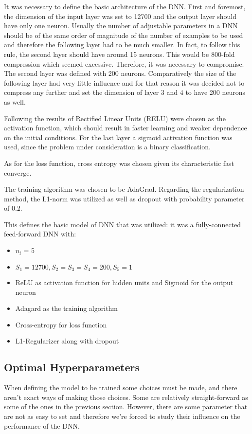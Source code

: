 It was necessary to define the basic architecture of the DNN. First and foremost, the dimension of the input layer was set to 12700 and the output layer should have only one neuron.
Usually the number of adjustable parameters in a DNN should be of the same order of magnitude of the number of examples to be used and therefore the following layer had to be much smaller. In fact, to follow this rule, the second layer should have around 15 neurons. This would be 800-fold compression which seemed excessive. Therefore, it was necessary to compromise. The second layer was defined with 200 neurons. Comparatively the size of the following layer had very little influence and for that reason it was decided not to compress any further and set the dimension of layer 3 and 4 to have 200 neurons as well. 

Following the results of \cite{glorot2011deep} Rectified Linear Units (RELU) were chosen as the activation function, which should result in faster learning and weaker dependence on the initial conditions. For the last layer a sigmoid activation function was used, since the problem under consideration is a binary classification.

As for the loss function, cross entropy was chosen given its characteristic fast converge.

The training algorithm was chosen to be AdaGrad.
Regarding the regularization method, the L1-norm was utilized as well as dropout with probability parameter of 0.2.

This defines the basic model of DNN that was utilized: it was a fully-connected feed-forward DNN with:
\begin{itemize}
\item $n_l$ = 5
\item $S_1 = 12700, S_2=S_3=S_4 = 200, S_5=1$
\item ReLU as activation function for hidden units and Sigmoid for the output neuron
\item Adagard as the training algorithm
\item Cross-entropy for loss function
\item L1-Regularizer along with dropout
\end{itemize}

\subsection{Optimal Hyperparameters}
\label{subsec:hyperparameters}

When defining the model to be trained some choices must be made, and there aren't exact ways of making those choices. Some are relatively straight-forward as some of the ones in the previous section. However, there are some parameter that are not as easy to set and therefore we're forced to study their influence on the performance of the DNN.

